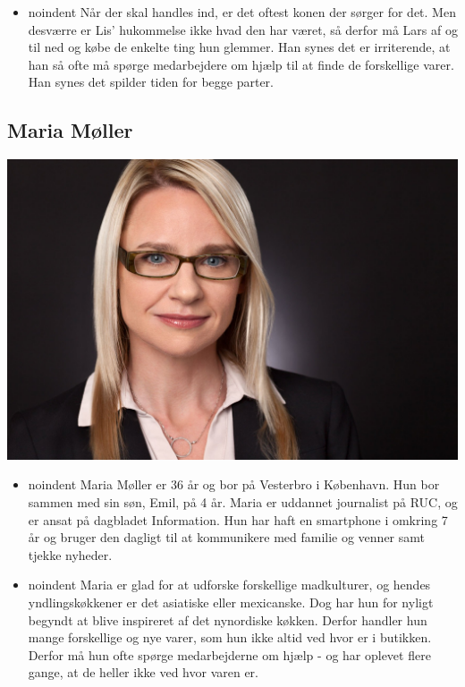 \documentclass[12pt]{article}
\begin{document}
\begin{enumarate}
\begin{itemize}
\item noindent Når der skal handles ind, er det oftest konen der sørger for det. Men desværre er Lis' hukommelse ikke hvad den har været, så derfor må Lars af og til ned og købe de enkelte ting hun glemmer. Han synes det er irriterende, at han så ofte må spørge medarbejdere om hjælp til at finde de forskellige varer. Han synes det spilder tiden for begge parter.
\end{itemize}

\subsection*{Maria Møller}

\includegraphics[scale=0.2]{includes/maria.jpg}
\begin{itemize}
\item noindent Maria Møller er 36 år og bor på Vesterbro i København. Hun bor sammen med sin søn, Emil, på 4 år. Maria er uddannet journalist på RUC, og er ansat på dagbladet Information. Hun har haft en smartphone i omkring 7 år og bruger den dagligt til at kommunikere med familie og venner samt tjekke nyheder.\\

\item noindent Maria er glad for at udforske forskellige madkulturer, og hendes yndlingskøkkener er det asiatiske eller mexicanske. Dog har hun for nyligt begyndt at blive inspireret af det nynordiske køkken. Derfor handler hun mange forskellige og nye varer, som hun ikke altid ved hvor er i butikken. Derfor må hun ofte spørge medarbejderne om hjælp - og har oplevet flere gange, at de heller ikke ved hvor varen er.
\end{itemize}


\end{enumarate}
\end{document}

